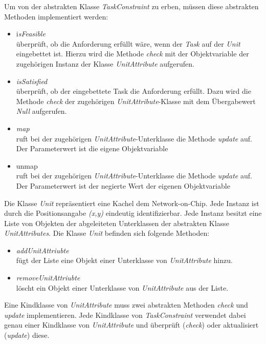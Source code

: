 Um von der abstrakten Klasse \textit{TaskConstraint} zu erben, müssen diese abstrakten Methoden implementiert werden:\\
\begin{itemize}
\item i\textit{sFeasible}\\
überprüft, ob die Anforderung erfüllt wäre, wenn der \textit{Task} auf der \textit{Unit} eingebettet ist. Hierzu wird die Methode \textit{check} mit der Objektvariable der zugehörigen Instanz der Klasse \textit{UnitAttribute} aufgerufen.
\item \textit{isSatisfied}\\
überprüft, ob der eingebettete Task die Anforderung erfüllt. Dazu wird die Methode \textit{check} der zugehörigen \textit{UnitAttribute}-Klasse mit dem Übergabewert \textit{Null} aufgerufen. 
\item \textit{map} \\
ruft bei der zugehörigen \textit{UnitAttribute}-Unterklasse die Methode \textit{update} auf. Der Parameterwert ist die eigene Objektvariable
\item \textit{}unmap\\
ruft bei der zugehörigen \textit{UnitAttribute}-Unterklasse die Methode \textit{update} auf. Der Parameterwert ist der negierte Wert der eigenen Objektvariable
\end{itemize}

Die Klasse \textit{Unit} repräsentiert eine Kachel dem Network-on-Chip. Jede Instanz ist durch die Positionsangabe \textit{(x,y)} eindeutig identifizierbar. Jede Instanz besitzt eine Liste von Objekten der abgeleiteten Unterklassen der abstrakten Klasse \textit{UnitAttributes}. Die Klasse \textit{Unit} befinden sich folgende Methoden:
\begin{itemize}
\item \textit{addUnitAttriubte}\\
fügt der Liste eine Objekt einer Unterklasse von \textit{UnitAttribute} hinzu.
\item \textit{removeUnitAttriubte}\\
löscht ein Objekt einer Unterklasse von \textit{UnitAttribute} aus der Liste.
\end{itemize}

Eine Kindklasse von \textit{UnitAttribute} muss zwei abstrakten Methoden \textit{check} und \textit{update} implementieren. Jede Kindklasse von \textit{TaskConstraint} verwendet dabei genau einer Kindklasse von \textit{UnitAttribute} und überprüft (\textit{check}) oder aktualisiert (\textit{update}) diese.


